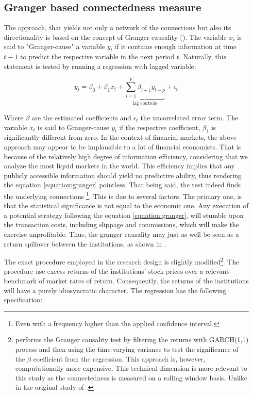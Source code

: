 \documentclass[12pt]{article}
\begin{document}
\subsection{Granger based connectedness measure}\label{subsection:granger}

The approach, that yields not only a network of the connections but also its directionality is based on the concept of Granger causality (\cite{granger69}). The variable $x_t$ is said to "Granger-cause" a variable $y_t$ if it contains enough information at time $t-1$ to predict the respective variable in the next period $t$. Naturally, this statement is tested by running a regression with lagged variable:

\begin{equation}\label{equation:granger}
	y_t = \beta_0 + \beta_1 x_t + \underbrace{\sum_{i=1}^{p} \beta_{i+1} y_{t - p}}_{\text{lag controls}} + \epsilon_t
\end{equation}

Where $\beta$ are the estimated coefficients and $\epsilon_t$ the uncorrelated error term. The variable $x_t$ is said to Granger-cause $y_t$ if the respective coefficient, $\beta_1$ is significantly different from zero. In the context of financial markets, the above approach may appear to be implausible to a lot of financial economists. That is because of the relatively high degree of information efficiency, considering that we analyze the most liquid markets in the world. This efficiency implies that any publicly accessible information should yield no predictive ability, thus rendering the equation \ref{equation:granger} pointless. That being said, the test indeed finds the underlying connections \footnote{Even with a frequency higher than the applied confidence interval.}. This is due to several factors. The primary one, is that the statistical significance is not equal to the economic one. Any execution of a potential strategy following the equation \ref{equation:granger}, will stumble upon the transaction costs, including slippage and commissions, which will make the exercise unprofitable. Thus, the granger causality may just as well be seen as a return spillover between the institutions, as shown in \cite{battison12}.

The exact procedure employed in the research design is slightly modified\footnote{\cite{billio12} performs the Granger causality test by filtering the returns with GARCH(1,1) process and then using the time-varying variance to test the significance of the $\beta$ coefficient from the regression. This approach is, however, computationally more expensive. This technical dimension is more relevant to this study as the connectedness is measured on a rolling window basis. Unlike in the original study of \cite{billio12}.}. The procedure use excess returns of the institutions' stock prices over a relevant benchmark of market rates of return. Consequently, the returns of the institutions will have a purely idiosyncratic character. The regression has the following specification:
\end{document}
